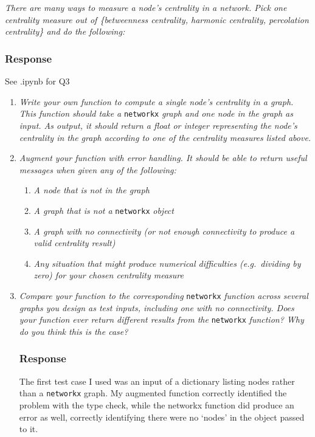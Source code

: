 \documentclass{article}
\newcommand{\response}{\subsubsection*{Response}}
\begin{document}
\section{}

\textit{There are many ways to measure a node's centrality in a network. Pick one centrality measure out of \{betweenness centrality, harmonic centrality, percolation centrality\} and do the following:}
\response
    See .ipynb for Q3

\begin{enumerate}[label=(\alph*)]
    \item \textit{Write your own function to compute a single node's centrality in a graph. This function should take a} \texttt{networkx}\textit{ graph and one node in the graph as input. As output, it should return a float or integer representing the node's centrality in the graph according to one of the centrality measures listed above.}


    \item \textit{Augment your function with error handling. It should be able to return useful messages when given any of the following:}
    \begin{enumerate}[label=\roman*.]
        \item \textit{A node that is not in the graph}
        \item \textit{A graph that is not a} \texttt{networkx} \textit{object}
        \item \textit{A graph with no connectivity (or not enough connectivity to produce a valid centrality result)}
        \item \textit{Any situation that might produce numerical difficulties (e.g.\ dividing by zero) for your chosen centrality measure}
    \end{enumerate}

    \item \textit{Compare your function to the corresponding }\texttt{networkx}\textit{ function across several graphs you design as test inputs, including one with no connectivity. Does your function ever return different results from the }\texttt{networkx}\textit{ function? Why do you think this is the case?}
    \response
    The first test case I used was an input of a dictionary listing nodes rather than a \texttt{networkx} graph. My augmented function correctly identified the problem with the type check, while the networkx function did produce an error as well, correctly identifying there were no `nodes' in the object passed to it.


\end{enumerate}
\end{document}
